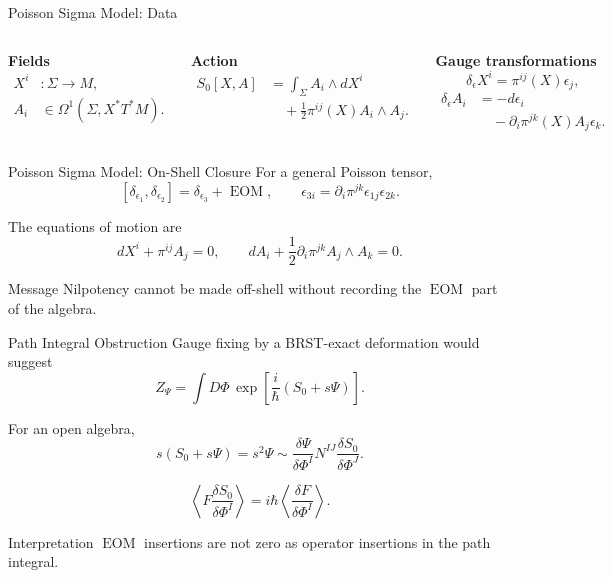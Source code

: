\documentclass[aspectratio=169,professionalfonts]{beamer}
\newcommand{\sidehead}[1]{\textcolor{CourseTeal}{\textbf{#1}}}
\newcommand{\EOM}{\ensuremath{\operatorname{EOM}}}
\begin{document}
\begin{frame}{Poisson Sigma Model: Data}
  \small
  \begin{columns}[T,onlytextwidth]
    \sidehead{Fields}
    \[
      \begin{aligned}
        X^i&:\Sigma\to M,\\
        A_i&\in\Omega^1(\Sigma,X^*T^*M).
      \end{aligned}
    \]

    \sidehead{Action}
    \[
      \begin{aligned}
        S_0[X,A]
        &=\int_\Sigma A_i\wedge dX^i\\
        &\quad+\frac12\pi^{ij}(X)A_i\wedge A_j .
      \end{aligned}
    \]

    \sidehead{Gauge transformations}
    \[
      \delta_\epsilon X^i=\pi^{ij}(X)\epsilon_j ,
    \]
    \[
      \begin{aligned}
        \delta_\epsilon A_i
        &=-d\epsilon_i\\
        &\quad-\partial_i\pi^{jk}(X)A_j\epsilon_k .
      \end{aligned}
    \]
  \end{columns}
\end{frame}

\begin{frame}{Poisson Sigma Model: On-Shell Closure}
  For a general Poisson tensor,
  \[
    [\delta_{\epsilon_1},\delta_{\epsilon_2}]
    =\delta_{\epsilon_3}+\EOM,
    \qquad
    \epsilon_{3i}
    =\partial_i\pi^{jk}\epsilon_{1j}\epsilon_{2k}.
  \]

  The equations of motion are
  \[
    dX^i+\pi^{ij}A_j=0,
    \qquad
    dA_i+\frac12\partial_i\pi^{jk}A_j\wedge A_k=0 .
  \]

  \begin{block}{Message}
    Nilpotency cannot be made off-shell without recording the \EOM{} part of
    the algebra.
  \end{block}
\end{frame}

\begin{frame}{Path Integral Obstruction}
  Gauge fixing by a BRST-exact deformation would suggest
  \[
    Z_\Psi=\int D\Phi\,
    \exp\left[\frac{i}{\hbar}(S_0+s\Psi)\right].
  \]

  For an open algebra,
  \[
    s(S_0+s\Psi)=s^2\Psi
    \sim
    \frac{\delta\Psi}{\delta\Phi^I}
    N^{IJ}\frac{\delta S_0}{\delta\Phi^J}.
  \]

  \[
    \left\langle F\frac{\delta S_0}{\delta\Phi^I}\right\rangle
    =i\hbar\left\langle\frac{\delta F}{\delta\Phi^I}\right\rangle .
  \]

  \begin{alertblock}{Interpretation}
    \EOM{} insertions are not zero as operator insertions in the path integral.
  \end{alertblock}
\end{frame}
\end{document}
